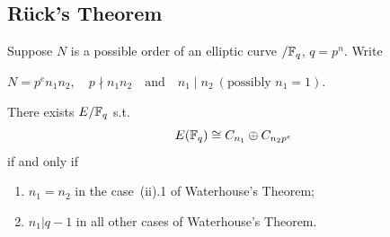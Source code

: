 \documentclass[10pt,handout]{beamer} %
\begin{document}
\begin{frame}[label=current]
\end{frame}

\subsection{R\"uck's Theorem}
\begin{frame}
\begin{theorem}[R\"uck]
Suppose $N$ is a possible order of an elliptic curve $/\mathbb F_q$,  $q=p^n$.  Write

\centerline{
$N = p^e n_1 n_2,\quad p\nmid n_1 n_2\quad\text{and}\quad n_1\mid n_2\ (\text{possibly }n_1 = 1).$}

There exists $E/\mathbb F_q$ s.t.
$$E(\mathbb F_q)\cong C_{n_1}\oplus C_{n_2p^e}$$
if and only if
\begin{enumerate}[<+-| alert@+>]
\item $n_1 = n_2$ in the case~(ii).1 of Waterhouse's Theorem;
\item $n_1 |q - 1$ in all other cases of  Waterhouse's Theorem.
\end{enumerate}
\end{theorem}\pause

\begin{example}
\end{example}
\end{frame}
\end{document}
